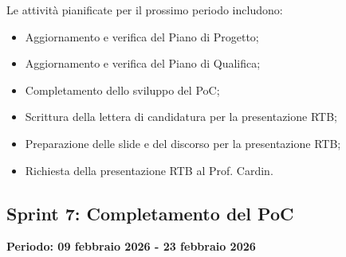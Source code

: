 \documentclass[11pt,a4paper]{article}
\begin{document}
Le attività pianificate per il prossimo periodo includono:
\begin{itemize}
    \item Aggiornamento e verifica del Piano di Progetto;
    \item Aggiornamento e verifica del Piano di Qualifica;
    \item Completamento dello sviluppo del PoC;
    \item Scrittura della lettera di candidatura per la presentazione RTB;
    \item Preparazione delle slide e del discorso per la presentazione RTB;
    \item Richiesta della presentazione RTB al Prof. Cardin.
\end{itemize}

\newpage
\subsection{Sprint 7: Completamento del PoC}
{\textbf{Periodo: 09 febbraio 2026 - 23 febbraio 2026}\par}
\end{document}
